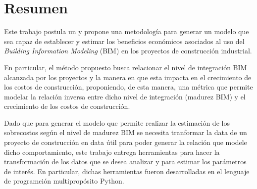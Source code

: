 \chapter*{Resumen}

Este trabajo postula un y propone una metodología para generar un modelo que sea capaz de establecer y estimar los beneficios económicos asociados al uso del \emph{Building Information Modeling} (BIM) en los proyectos de construcción industrial. 

En particular, el método propuesto busca relacionar el nivel de integración BIM alcanzada por los proyectos y la manera en que esta impacta en el crecimiento de los costos de construcción, proponiendo, de esta manera, una métrica que permite modelar la relación inversa entre dicho nivel de integración (madurez BIM) y el crecimiento de los costos de construcción.

Dado que para generar el modelo que permite realizar la estimación de los sobrecostos según el nivel de madurez BIM se necesita tranformar la data de un proyecto de construcción en data útil para poder generar la relación que modele dicho comportamiento, este trabajo entrega herramientas para hacer la transformación de los datos que se desea analizar y para estimar los parámetros de interés. En particular, dichas herramientas fueron desarrolladas en el lenguaje de programción multipropósito Python.


